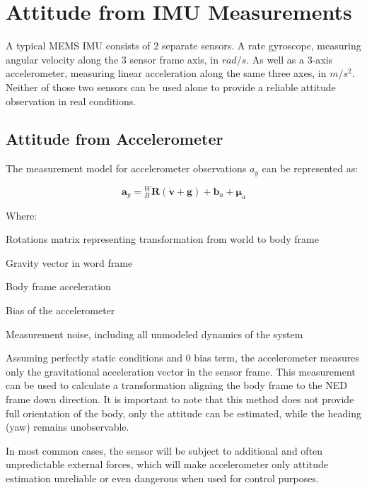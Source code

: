 \chapter{Attitude from IMU Measurements}

A typical MEMS IMU consists of 2 separate sensors. A rate gyroscope, measuring angular velocity along the 3 sensor frame axis, in $rad/s$. As well as a 3-axis accelerometer, measuring linear acceleration along the same three axes, in $m/s^2$.
Neither of those two sensors can be used alone to provide a reliable attitude observation in  real conditions.

\section{Attitude from Accelerometer}
The measurement model for accelerometer observations $a_y$ can be represented as:

\begin{equation}
	\boldsymbol{a}_y = {}^{W}_{B}\boldsymbol{R}(\boldsymbol{\dot{v}} + \boldsymbol{g}) + \boldsymbol{b}_a + \boldsymbol{\mu}_a
	\label{eq:y_acc}
\end{equation}

Where:
\begin{eqwhere}[3cm]
	\item[${}^{W}_{B}\boldsymbol{R}$] Rotations matrix representing transformation from world to body frame
	\item[$\boldsymbol{g}$] Gravity vector in word frame
	\item[$\boldsymbol{\dot{v}}$] Body frame acceleration
	\item[${}\boldsymbol{b}_a$] Bias of the accelerometer
	\item[${}\boldsymbol{\mu}_a$] Measurement noise, including all unmodeled dynamics of the system
\end{eqwhere}

Assuming perfectly static conditions and 0 bias term, the accelerometer measures only the gravitational acceleration vector in the sensor frame. This measurement can be used to calculate a transformation aligning the body frame to the NED frame down direction. It is important to note that this method does not provide full orientation of the body, only the attitude can be estimated, while the heading (yaw) remains unobservable.

In most common cases, the sensor will be subject to additional and often unpredictable external forces, which will make accelerometer only attitude estimation unreliable or even dangerous when used for control purposes.


